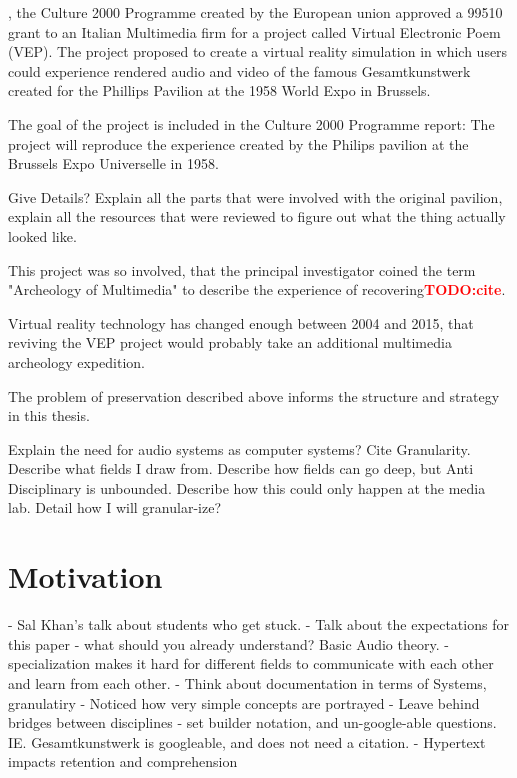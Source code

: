 \documentclass{tufte-book}
\newcommand{\TODO}[1]{\textcolor{red}{\bf TODO:#1}\xspace}
\begin{document}
, the Culture 2000 Programme created by the 
European union approved a 99510\EUR{} grant to an Italian Multimedia 
firm for a project called Virtual Electronic Poem (VEP)\cite{eu2004}. 
The project proposed to create a virtual reality simulation in which 
users could experience rendered audio and video of the famous
Gesamtkunstwerk created for the Phillips Pavilion at the 1958 World
Expo in Brussels. 

The goal of the project is included in the Culture 2000 Programme
report: The project will reproduce the experience created by the
Philips pavilion at the Brussels Expo Universelle in 1958.

Give Details? Explain all the parts that were involved with the
original pavilion, explain all the resources that were reviewed to
figure out what the thing actually looked like.

This project was so involved, that the principal investigator coined
the term "Archeology of Multimedia" to describe the experience of
recovering\TODO{cite}.

Virtual reality technology has changed enough between 2004 and 2015,
that reviving the VEP project would probably take an additional
multimedia archeology expedition.

The problem of preservation described above informs the structure and
strategy in this thesis. 

Explain the need for audio systems as computer systems? Cite
Granularity. Describe what fields I draw from. Describe how fields can
go deep, but Anti Disciplinary is unbounded. Describe how this could
only happen at the media lab. Detail how I will granular-ize?

\section{Motivation}
\label{sec:motivation}

  - Sal Khan's talk about students who get stuck. 
  - Talk about the expectations for this paper - what should you
    already understand? Basic Audio theory. 
  - specialization makes it hard for different fields to communicate
  with each other and learn from each other.
  - Think about documentation in terms of Systems, granulatiry
  - Noticed how very simple concepts are portrayed 
  - Leave behind bridges between disciplines
  - set builder notation, and un-google-able
  questions. IE. Gesamtkunstwerk is googleable, and does not need a
  citation.
  - Hypertext impacts retention and comprehension
\end{document}
